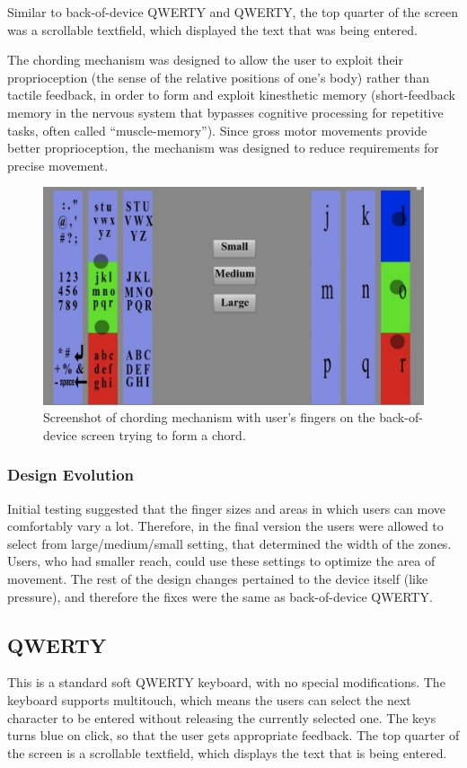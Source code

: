 Similar to back-of-device QWERTY and QWERTY, the top quarter of the screen was a scrollable textfield, which displayed the text that was being entered.

The chording mechanism was designed to allow the user to exploit their proprioception (the sense of the relative positions of one's body) rather than tactile feedback, in order to form and exploit kinesthetic memory (short-feedback memory in the nervous system that bypasses cognitive processing for repetitive tasks, often called ``muscle-memory''). Since gross motor movements provide better proprioception, the mechanism was designed to reduce requirements for precise movement.


\begin{figure}
    \includegraphics[scale=0.45]{Figures/chording.pdf} 
    \caption{Screenshot of chording mechanism with user's fingers on
      the back-of-device screen trying to form a chord.}
       \label{fig:chording_example}
\end{figure} 
\subsubsection{Design Evolution}

Initial testing suggested that the finger sizes and areas in which users can move comfortably vary a lot. Therefore, in the final version the users were allowed to select from large/medium/small setting, that determined the width of the zones. Users, who had smaller reach, could use these settings to optimize the area of movement. The rest of the design changes pertained to the device itself (like pressure), and therefore the fixes were the same as back-of-device QWERTY.

\subsection{QWERTY}

This is a standard soft QWERTY keyboard, with no special modifications. The keyboard supports multitouch, which means the users can select the next character to be entered without releasing the currently selected one. The keys turns blue on click, so that the user gets appropriate feedback. The top quarter of the screen is a scrollable textfield, which displays the text that is being entered.
